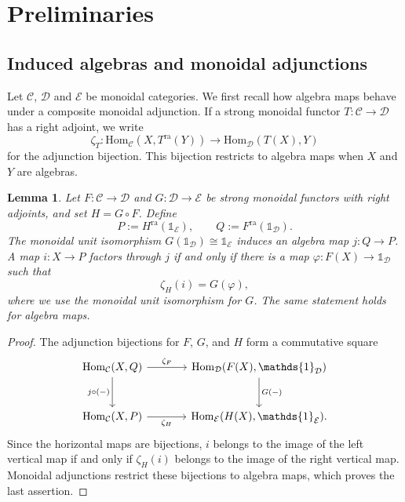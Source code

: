 \documentclass[10pt,a4paper]{amsart}
\numberwithin{equation}{section}
\newtheorem{lemma}[thmctr]{Lemma}
\newcommand{\unit}{\mathds{1}}
\newcommand{\C}{\mathcal{C}}
\newcommand{\D}{\mathcal{D}}
\newcommand{\E}{\mathcal{E}}
\newcommand{\Hom}{\mathrm{Hom}}
\newcommand{\ra}{\mathrm{ra}}
\begin{document}

\section{Preliminaries}\label{sec:preliminaries}


\subsection{Induced algebras and monoidal adjunctions}
\label{subsec:induced-transparent-algebra}

Let $\C$, $\D$ and $\E$ be monoidal categories. 
We first recall how algebra maps behave under a composite monoidal
adjunction. If a strong monoidal functor $T:\C\to\D$ has a right adjoint,
we write
\[
  \zeta_T:\Hom_{\C}(X,T^{\ra}(Y))
  \longrightarrow
  \Hom_{\D}(T(X),Y)
\]
for the adjunction bijection. This bijection restricts to algebra maps when
$X$ and $Y$ are algebras.

\begin{lemma}\label{lem:alg-map-factorization}
Let $F:\C\to\D$ and $G:\D\to\E$ be strong monoidal functors with right
adjoints, and set $H=G\circ F$. Define
\[
  P:=H^{\ra}(\unit_{\E}),
  \qquad
  Q:=F^{\ra}(\unit_{\D}).
\]
The monoidal unit isomorphism $G(\unit_{\D})\cong\unit_{\E}$ induces an
algebra map $j:Q\to P$. A map $i:X\to P$ factors through $j$ if and only if
there is a map $\varphi:F(X)\to\unit_{\D}$ such that
\[
  \zeta_H(i)=G(\varphi),
\]
where we use the monoidal unit isomorphism for $G$. The same statement holds
for algebra maps.
\end{lemma}

\begin{proof}
The adjunction bijections for $F$, $G$, and $H$ form a commutative square
\[
\begin{tikzcd}[column sep=large,row sep=large]
\operatorname{Hom}_{\C}(X,Q)
  \arrow[r,"\zeta_F"]
  \arrow[d,"j\circ(-)"']
&
\operatorname{Hom}_{\D}(F(X),\unit_{\D})
  \arrow[d,"G(-)"]
\\
\operatorname{Hom}_{\C}(X,P)
  \arrow[r,"\zeta_H"']
&
\operatorname{Hom}_{\E}(H(X),\unit_{\E}).
\end{tikzcd}
\]
Since the horizontal maps are bijections, $i$ belongs to the image of the
left vertical map if and only if $\zeta_H(i)$ belongs to the image of the
right vertical map. Monoidal adjunctions restrict these bijections to algebra
maps, which proves the last assertion.
\end{proof}
\end{document}
